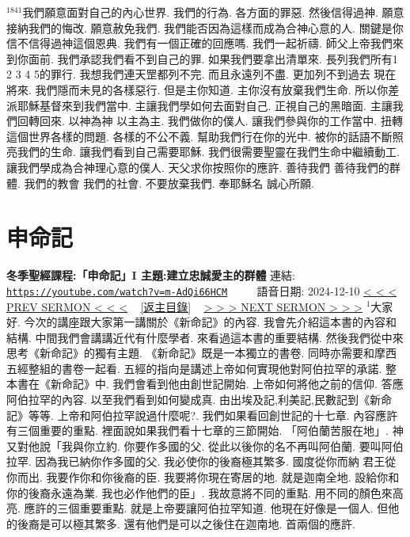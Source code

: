 \documentclass{book}
\begin{document}
$^{1841}$我們願意面對自己的內心世界.
我們的行為.
各方面的罪惡.
然後信得過神.
願意接納我們的悔改.
願意赦免我們.
我們能否因為這樣而成為合神心意的人.
關鍵是你信不信得過神這個恩典.
我們有一個正確的回應嗎.
我們一起祈禱.
師父上帝我們來到你面前.
我們承認我們看不到自己的罪.
如果我們要拿出清單來.
長列我們所有1 2 3 4 5的罪行.
我想我們連天罡都列不完.
而且永遠列不盡.
更加列不到過去 現在 將來.
我們隱而未見的各樣惡行.
但是主你知道.
主你沒有放棄我們生命.
所以你差派耶穌基督來到我們當中.
主讓我們學如何去面對自己.
正視自己的黑暗面.
主讓我們回轉回來.
以神為神 以主為主.
我們做你的僕人.
讓我們參與你的工作當中.
扭轉這個世界各樣的問題.
各樣的不公不義.
幫助我們行在你的光中.
被你的話語不斷照亮我們的生命.
讓我們看到自己需要耶穌.
我們很需要聖靈在我們生命中繼續動工.
讓我們學成為合神理心意的僕人.
天父求你按照你的應許.
善待我們 善待我們的群體.
我們的教會 我們的社會.
不要放棄我們.
奉耶穌名 誠心所願.
\newpage



\section{申命記}
\label{sec:m_AdQi66HCM}
\textbf{冬季聖經課程:「申命記」I 主題:建立忠誠愛主的群體}
\newline
\newline
連結: \href{https://youtube.com/watch?v=m-AdQi66HCM}{\texttt{https://youtube.com/watch?v=m-AdQi66HCM}} ~~~~ 語音日期: 2024-12-10
\newline
\newline
\hyperref[sec:_dFYhclLeWU]{\small{< < < PREV SERMON < < <}}
~
\hyperref[sec:index]{\small{[返主目錄]}}
~
\hyperref[sec:0UjUn93f77k]{\small{> > > NEXT SERMON > > >}}
\newline
\newline
$^{1}$大家好.
今次的講座跟大家第一講關於《新命記》的內容.
我會先介紹這本書的內容和結構.
中間我們會講講近代有什麼學者.
來看過這本書的重要結構.
然後我們從中來思考《新命記》的獨有主題.
《新命記》既是一本獨立的書卷.
同時亦需要和摩西五經整組的書卷一起看.
五經的指向是講述上帝如何實現他對阿伯拉罕的承諾.
整本書在《新命記》中.
我們會看到他由創世記開始.
上帝如何將他之前的信仰.
答應阿伯拉罕的內容.
以至我們看到如何變成真.
由出埃及記,利美記,民數記到《新命記》等等.
上帝和阿伯拉罕說過什麼呢?.
我們如果看回創世記的十七章.
內容應許有三個重要的重點.
裡面說如果我們看十七章的三節開始.
「阿伯蘭苦服在地」.
神又對他說「我與你立約.
你要作多國的父.
從此以後你的名不再叫阿伯蘭.
要叫阿伯拉罕.
因為我已納你作多國的父.
我必使你的後裔極其繁多.
國度從你而納 君王從你而出.
我要作你和你後裔的臣.
我要將你現在寄居的地.
就是迦南全地.
設給你和你的後裔永遠為業.
我也必作他們的臣」.
我故意將不同的重點.
用不同的顏色來高亮.
應許的三個重要重點.
就是上帝要讓阿伯拉罕知道.
他現在好像是一個人.
但他的後裔是可以極其繁多.
還有他們是可以之後住在迦南地.
首兩個的應許.
\end{document}
